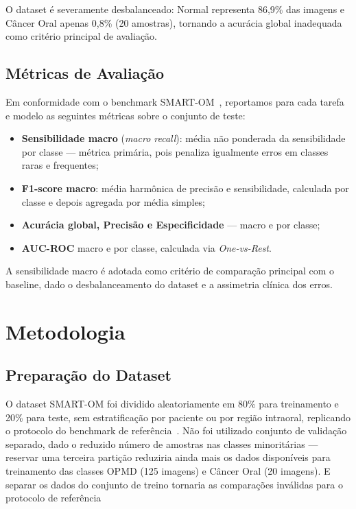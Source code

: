 \documentclass[12pt]{article}
\begin{document}
O dataset é severamente desbalanceado: Normal representa 86,9\% das
imagens e Câncer Oral apenas 0,8\% (20 amostras), tornando a acurácia
global inadequada como critério principal de avaliação.


\subsection{Métricas de Avaliação}

Em conformidade com o benchmark SMART-OM~\cite{smartom}, reportamos para
cada tarefa e modelo as seguintes métricas sobre o conjunto de teste:

\begin{itemize}
  \item \textbf{Sensibilidade macro} (\textit{macro recall}): média não
    ponderada da sensibilidade por classe — métrica primária, pois penaliza
    igualmente erros em classes raras e frequentes;
  \item \textbf{F1-score macro}: média harmônica de precisão e sensibilidade,
    calculada por classe e depois agregada por média simples;
  \item \textbf{Acurácia global, Precisão e Especificidade} — macro e
    por classe;
  \item \textbf{AUC-ROC} macro e por classe, calculada via
    \textit{One-vs-Rest}.
\end{itemize}

A sensibilidade macro é adotada como critério de comparação principal
com o baseline, dado o desbalanceamento do dataset e a assimetria
clínica dos erros.

\section{Metodologia}
\label{sec:metodologia}

\subsection{Preparação do Dataset}

O dataset SMART-OM foi dividido aleatoriamente em 80\% para treinamento
e 20\% para teste, sem estratificação por paciente ou por região
intraoral, replicando o protocolo do benchmark de referência~\cite{smartom}.
Não foi utilizado conjunto de validação separado, dado o reduzido número
de amostras nas classes minoritárias — reservar uma terceira partição
reduziria ainda mais os dados disponíveis para treinamento das classes
OPMD (125 imagens) e Câncer Oral (20 imagens). E separar os dados do conjunto de treino tornaria as comparações inválidas para o protocolo de referência
\end{document}
